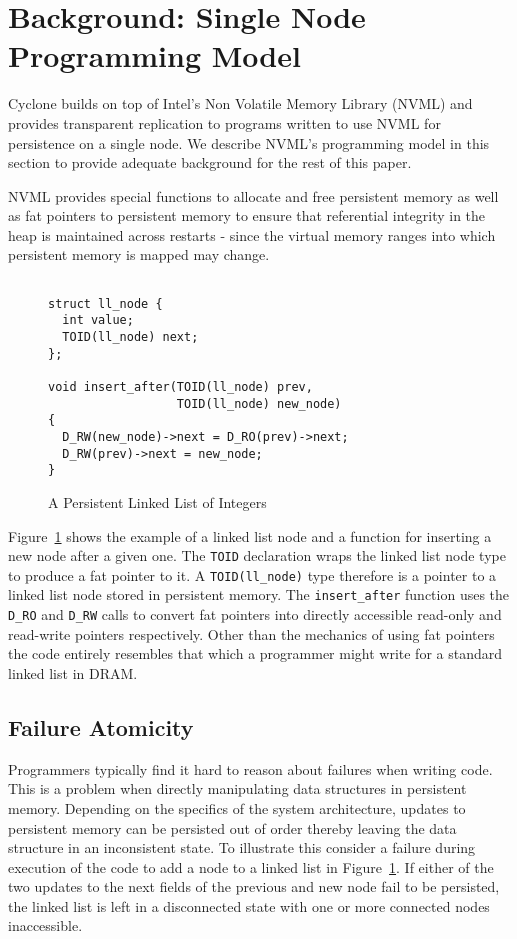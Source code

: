 \documentclass[twocolumn]{article}
\begin{document}
\section{Background: Single Node Programming Model}
Cyclone builds on top of Intel's Non Volatile Memory Library (NVML) and provides
transparent replication to programs written to use NVML for persistence on a
single node. We describe NVML's programming model in this section to provide
adequate background for the rest of this paper.

NVML provides special functions to allocate and free persistent memory as well
as fat pointers to persistent memory to ensure that referential integrity in the
heap is maintained across restarts - since the virtual memory ranges into which
persistent memory is mapped may change.

\begin{figure}
{\scriptsize
\begin{verbatim}

struct ll_node {
  int value;
  TOID(ll_node) next;
};

void insert_after(TOID(ll_node) prev, 
                  TOID(ll_node) new_node)
{
  D_RW(new_node)->next = D_RO(prev)->next;
  D_RW(prev)->next = new_node;
}

\end{verbatim}
}
\caption{A Persistent Linked List of Integers}
\label{fig:example}
\end{figure}

Figure~\ref{fig:example} shows the example of a linked list node and a function
for inserting a new node after a given one. The {\tt TOID} declaration wraps the
linked list node type to produce a fat pointer to it. A {\tt TOID(ll\_node)}
type therefore is a pointer to a linked list node stored in persistent memory.
The {\tt insert\_after} function uses the {\tt D\_RO} and {\tt D\_RW} calls to
convert fat pointers into directly accessible read-only and read-write pointers
respectively. Other than the mechanics of using fat pointers the code entirely
resembles that which a programmer might write for a standard linked list in
DRAM.

\subsection{Failure Atomicity}
Programmers typically find it hard to reason about failures when writing
code. This is a problem when directly manipulating data structures in persistent
memory. Depending on the specifics of the system architecture, updates to
persistent memory can be persisted out of order thereby leaving the data
structure in an inconsistent state. To illustrate this consider a failure during
execution of the code to add a node to a linked list in
Figure~\ref{fig:example}. If either of the two updates to the next fields of the
previous and new node fail to be persisted, the linked list is left in a
disconnected state with one or more connected nodes inaccessible.
\end{document}
